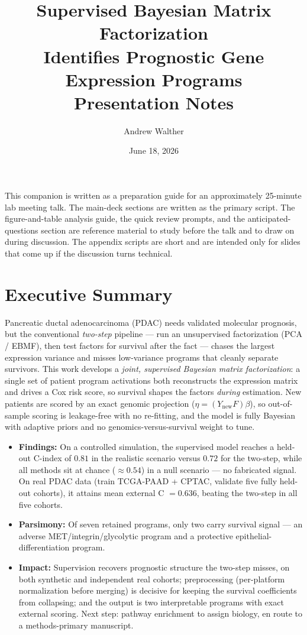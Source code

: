 \documentclass[11pt]{article}
\title{Supervised Bayesian Matrix Factorization\\Identifies Prognostic Gene Expression Programs\\[0.8em]\large Presentation Notes}
\author{Andrew Walther}
\date{June 18, 2026}
\newcommand{\sectionlabel}[1]{\textbf{#1}}
\begin{document}
\maketitle

\noindent This companion is written as a preparation guide for an approximately 25-minute lab
meeting talk. The main-deck sections are written as the primary script. The figure-and-table
analysis guide, the quick review prompts, and the anticipated-questions section are reference
material to study before the talk and to draw on during discussion. The appendix scripts are short
and are intended only for slides that come up if the discussion turns technical.

\section*{Executive Summary}

Pancreatic ductal adenocarcinoma (PDAC) needs validated molecular prognosis, but the conventional
\emph{two-step} pipeline --- run an unsupervised factorization (PCA / EBMF), then test factors for
survival after the fact --- chases the largest expression variance and misses low-variance programs
that cleanly separate survivors. This work develops a \emph{joint, supervised Bayesian matrix
factorization}: a single set of patient program activations both reconstructs the expression matrix
and drives a Cox risk score, so survival shapes the factors \emph{during} estimation. New patients
are scored by an exact genomic projection ($\eta = (Y_{\text{new}}F)\beta$), so out-of-sample
scoring is leakage-free with no re-fitting, and the model is fully Bayesian with adaptive priors and
no genomics-versus-survival weight to tune.

\begin{itemize}
\item \sectionlabel{Findings:} On a controlled simulation, the supervised model reaches a held-out
C-index of $0.81$ in the realistic scenario versus $0.72$ for the two-step, while all methods sit at
chance ($\approx 0.54$) in a null scenario --- no fabricated signal. On real PDAC data (train
TCGA-PAAD + CPTAC, validate five fully held-out cohorts), it attains mean external C $= 0.636$,
beating the two-step in all five cohorts.
\item \sectionlabel{Parsimony:} Of seven retained programs, only two carry survival signal --- an
adverse MET/integrin/glycolytic program and a protective epithelial-differentiation program.
\item \sectionlabel{Impact:} Supervision recovers prognostic structure the two-step misses, on both
synthetic and independent real cohorts; preprocessing (per-platform normalization before merging) is
decisive for keeping the survival coefficients from collapsing; and the output is two interpretable
programs with exact external scoring. Next step: pathway enrichment to assign biology, en route to a
methods-primary manuscript.
\end{itemize}
\end{document}
